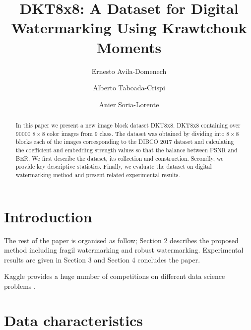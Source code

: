 \documentclass[runningheads]{llncs}
\begin{document}
%
\title{DKT8x8: A Dataset for Digital Watermarking Using Krawtchouk Moments}
%
%
\author{Ernesto Avila-Domenech \and
Alberto Taboada-Crispi \and
Anier Soria-Lorente}
%
%
%
\maketitle              %
%
\begin{abstract}
In this paper we present a new image block dataset DKT8x8. DKT8x8 containing over 90000 $8\times 8$ color images from 9 class. The dataset was obtained by dividing into $8\times 8$ blocks each of the images corresponding to the DIBCO 2017 dataset and calculating the coefficient and embedding strength values so that the balance between PSNR and BER. We first describe the dataset, its collection and construction. Secondly, we provide key descriptive statistics. Finally, we evaluate the dataset on digital watermarking method and present related experimental results.

\end{abstract}
%
%
%
\section{Introduction}
The rest of the paper is organised as follow; Section 2 describes the proposed method including fragil watermarking and robust watermarking. Experimental results are given in Section 3 and Section 4 concludes the paper.

Kaggle provides a huge number of competitions on different data science problems \cite{Subramanian2018}.

\section{Data characteristics}
\end{document}
